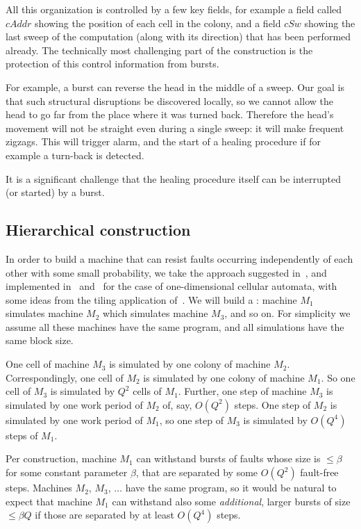 \documentclass[12pt]{memoir}
\renewcommand{\le}{\leq}
\newcommand{\fld}[1]{\ensuremath{\textit{#1}}}
\newcommand{\cAddr}{\fld{cAddr}}
\newcommand{\cSweep}{\fld{cSw}}
\begin{document}
All this organization is controlled by a few key fields, for example a field
called \( \cAddr \) showing the position of each cell in the colony, and a field
\( \cSweep \) showing the last sweep of the computation (along with its direction)
that has been performed already.
The technically most challenging part of the construction is the protection of this
control information from bursts.

For example, a burst can reverse the head in the middle of a sweep.
Our goal is that such structural disruptions be discovered locally, so
we cannot allow the head to go far from the place where it was turned back.
Therefore the head's movement will not be straight even during a single
sweep: it will make frequent zigzags.
This will trigger alarm, and the start of a healing procedure if for example
a turn-back is detected.

It is a significant challenge that the healing procedure
itself can be interrupted (or started) by a burst.


\subsection{Hierarchical construction}

In order to build a machine that can resist faults 
occurring independently of each other with some small probability,
we take the approach suggested in~\cite{Kurd78},
and implemented in~\cite{Gacs1dim86} and~\cite{GacsSorg01}
for the case of one-dimensional cellular automata, with some ideas
from the tiling application of~\cite{DurandRomashShenTiling12}.
We will build a :
machine \( M_1 \) simulates machine \( M_2 \) which 
simulates machine \( M_3 \), and so on.
For simplicity we assume all these machines have the same program,
and all simulations have the same block size.

One cell of machine \( M_3 \) is simulated by one colony of machine \( M_2 \).
Correspondingly, one cell of \( M_2 \) is simulated by
one colony of machine \( M_1 \).
So one cell of \( M_3 \) is simulated by \( Q^2 \) cells of \( M_1 \).
Further, one step of machine \( M_3 \) is simulated by one
work period of \( M_2 \) of, say, \( O(Q^{2}) \) steps.
One step of \( M_2 \) is simulated by one work period of \( M_1 \),
so one step of \( M_3 \) is simulated by \( O(Q^{4}) \) steps of \( M_1 \).

Per construction, machine \( M_{1} \) can withstand
bursts of faults whose size is \( \le \beta \) for some constant parameter \( \beta \), that
are separated by some \( O(Q^{2}) \) fault-free steps.
Machines \( M_2 \), \( M_3 \), \( \dots \) have the same program, so it
would be natural to expect that machine
\( M_1 \) can withstand also some \emph{additional}, larger bursts
of size \( \le \beta Q \) if those are separated by at least \( O(Q^{4}) \) steps.
\end{document}
